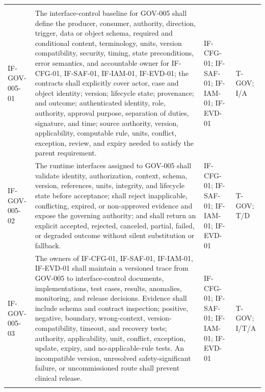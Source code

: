\documentclass[11pt,letterpaper]{article}
\begin{document}
\begin{scriptsize}
\begin{longtable}{@{}L{0.14\textwidth}L{0.49\textwidth}L{0.19\textwidth}L{0.10\textwidth}@{}}
\addlinespace[2pt]
 \\
\addlinespace[2pt]
\mbox{IF-GOV-005-01} & The interface-control baseline for GOV-005 shall define the producer, consumer, authority, direction, trigger, data or object schema, required and conditional content, terminology, units, version compatibility, security, timing, state preconditions, error semantics, and accountable owner for IF-CFG-01, IF-SAF-01, IF-IAM-01, IF-EVD-01; the contracts shall explicitly cover actor, case and object identity; version; lifecycle state; provenance; and outcome; authenticated identity, role, authority, approval purpose, separation of duties, signature, and time; source authority, version, applicability, computable rule, units, conflict, exception, review, and expiry needed to satisfy the parent requirement. & IF-CFG-01; IF-SAF-01; IF-IAM-01; IF-EVD-01 & T-GOV; I\slash\allowbreak{}A \\
\addlinespace[2pt]
\mbox{IF-GOV-005-02} & The runtime interfaces assigned to GOV-005 shall validate identity, authorization, context, schema, version, references, units, integrity, and lifecycle state before acceptance; shall reject inapplicable, conflicting, expired, or non-approved evidence and expose the governing authority; and shall return an explicit accepted, rejected, canceled, partial, failed, or degraded outcome without silent substitution or fallback. & IF-CFG-01; IF-SAF-01; IF-IAM-01; IF-EVD-01 & T-GOV; T\slash\allowbreak{}D \\
\addlinespace[2pt]
\mbox{IF-GOV-005-03} & The owners of IF-CFG-01, IF-SAF-01, IF-IAM-01, IF-EVD-01 shall maintain a versioned trace from GOV-005 to interface-control documents, implementations, test cases, results, anomalies, monitoring, and release decisions. Evidence shall include schema and contract inspection; positive, negative, boundary, wrong-context, version-compatibility, timeout, and recovery tests; authority, applicability, unit, conflict, exception, update, expiry, and no-applicable-rule tests. An incompatible version, unresolved safety-significant failure, or uncommissioned route shall prevent clinical release. & IF-CFG-01; IF-SAF-01; IF-IAM-01; IF-EVD-01 & T-GOV; I\slash\allowbreak{}T\slash\allowbreak{}A \\
\addlinespace[2pt]

\end{longtable}
\end{scriptsize}
\end{document}
